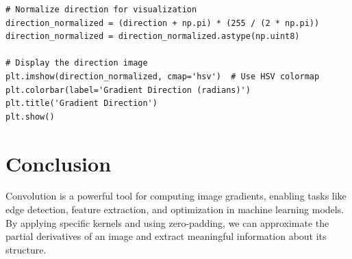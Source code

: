 \begin{notechapter}
\begin{verbatim}
# Normalize direction for visualization
direction_normalized = (direction + np.pi) * (255 / (2 * np.pi))
direction_normalized = direction_normalized.astype(np.uint8)

# Display the direction image
plt.imshow(direction_normalized, cmap='hsv')  # Use HSV colormap
plt.colorbar(label='Gradient Direction (radians)')
plt.title('Gradient Direction')
plt.show()
\end{verbatim}

\section{Conclusion}
Convolution is a powerful tool for computing image gradients,
enabling tasks like edge detection, feature extraction, and
optimization in machine learning models. By applying specific
kernels and using zero-padding, we can approximate the partial
derivatives of an image and extract meaningful information
about its structure.
\end{notechapter}
